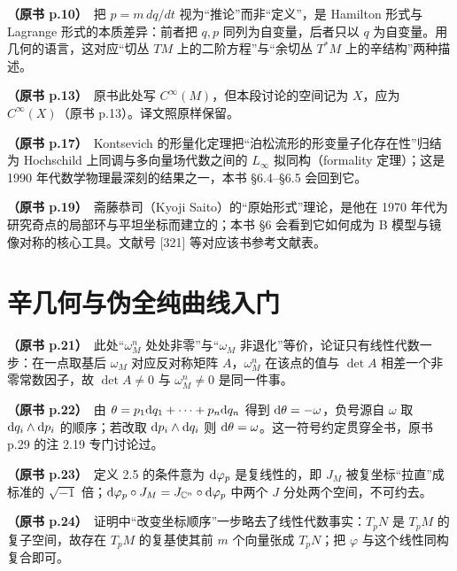 \noindent \textbf{（原书 p.10）}\ 把 $p=m\,dq/dt$ 视为“推论”而非“定义”，是 Hamilton 形式与 Lagrange 形式的本质差异：前者把 $q,p$ 同列为自变量，后者只以 $q$ 为自变量。用几何的语言，这对应“切丛 $TM$ 上的二阶方程”与“余切丛 $T^*M$ 上的辛结构”两种描述。\par\smallskip

\noindent \textbf{（原书 p.13）}\ 原书此处写 $C^\infty(M)$，但本段讨论的空间记为 $X$，应为 $C^\infty(X)$（原书 p.13）。译文照原样保留。\par\smallskip

\noindent \textbf{（原书 p.17）}\ Kontsevich 的形量化定理把“泊松流形的形变量子化存在性”归结为 Hochschild 上同调与多向量场代数之间的 $L_\infty$ 拟同构（formality 定理）；这是 1990 年代数学物理最深刻的结果之一，本书 §6.4–§6.5 会回到它。\par\smallskip

\noindent \textbf{（原书 p.19）}\ 斋藤恭司（Kyoji Saito）的“原始形式”理论，是他在 1970 年代为研究奇点的局部环与平坦坐标而建立的；本书 §6 会看到它如何成为 B 模型与镜像对称的核心工具。文献号 [321] 等对应该书参考文献表。\par\smallskip

\section*{辛几何与伪全纯曲线入门}

\noindent \textbf{（原书 p.21）}\ 此处“$\omega_M^n$ 处处非零”与“$\omega_M$ 非退化”等价，论证只有线性代数一步：在一点取基后 $\omega_M$ 对应反对称矩阵 $A$，$\omega_M^n$ 在该点的值与 $\det A$ 相差一个非零常数因子，故 $\det A\neq 0$ 与 $\omega_M^n\neq 0$ 是同一件事。\par\smallskip

\noindent \textbf{（原书 p.22）}\ 由 $\theta=p_1\mathrm{d} q_1+\cdots+p_n\mathrm{d} q_n$ 得到 $\mathrm{d}\theta=-\omega$，负号源自 $\omega$ 取 $\mathrm{d} q_i\wedge\mathrm{d} p_i$ 的顺序；若改取 $\mathrm{d} p_i\wedge\mathrm{d} q_i$ 则 $\mathrm{d}\theta=\omega$。这一符号约定贯穿全书，原书 p.29 的注 2.19 专门讨论过。\par\smallskip

\noindent \textbf{（原书 p.23）}\ 定义 2.5 的条件意为 $\mathrm{d}\varphi_p$ 是复线性的，即 $J_M$ 被复坐标“拉直”成标准的 $\sqrt{-1}$ 倍；$\mathrm{d}\varphi_p\circ J_M=J_{\mathbb{C}^n}\circ\mathrm{d}\varphi_p$ 中两个 $J$ 分处两个空间，不可约去。\par\smallskip

\noindent \textbf{（原书 p.24）}\ 证明中“改变坐标顺序”一步略去了线性代数事实：$T_pN$ 是 $T_pM$ 的复子空间，故存在 $T_pM$ 的复基使其前 $m$ 个向量张成 $T_pN$；把 $\varphi$ 与这个线性同构复合即可。\par\smallskip

